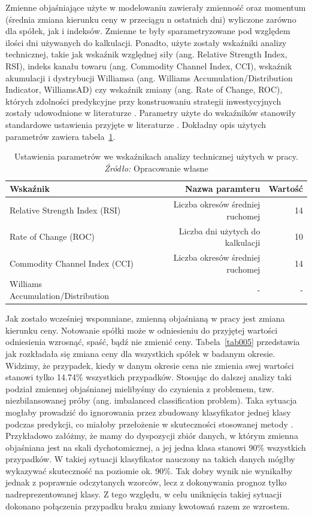\documentclass[12pt,a4paper,twoside,openany]{book}
\begin{document}
Zmienne objaśniające użyte w modelowaniu zawierały zmienność oraz momentum (średnia zmiana kierunku ceny w przeciągu n ostatnich dni) wyliczone zarówno dla spółek, jak i indeksów. Zmienne te były sparametryzowane pod względem ilości dni używanych do kalkulacji. Ponadto,  użyte zostały wskaźniki analizy technicznej, takie jak wskaźnik względnej siły (ang. Relative Strength Index, RSI), indeks kanału towaru (ang. Commodity Channel Index, CCI), wskaźnik akumulacji i dystrybucji Williamsa (ang. Williams Accumulation/Distribution Indicator, WilliamsAD) czy wskaźnik zmiany (ang. Rate of Change, ROC), których zdolności predykcyjne przy konstruowaniu strategii inwestycyjnych zostały udowodnione w literaturze \citep{patel2015}. Parametry użyte do wskaźników stanowiły standardowe ustawienia przyjęte w literaturze \citep{murphy1999}. Dokładny opis użytych parametrów zawiera tabela~\ref{tab004}.

\begin{table}[ht] 
\caption{Ustawienia parametrów we wskaźnikach analizy technicznej użytych w pracy. \textit{Źródło:} Opracowanie własne}\label{tab004}
\centering
\begin{tabular}{lrr}
  \hline
Wskaźnik & Nazwa paramteru & Wartość\\ 
  \hline
Relative Strength Index (RSI) & Liczba okresów średniej ruchomej & 14 \\
Rate of Change (ROC) & Liczba dni użytych do kalkulacji & 10 \\
Commodity Channel Index (CCI) & Liczba okresów średniej ruchomej & 14 \\
Williams Accumulation/Distribution & - & - \\
  \hline
\end{tabular}
\end{table}

Jak zostało wcześniej wspomniane, zmienną objaśnianą w pracy jest zmiana kierunku ceny. Notowanie spółki może w odniesieniu do przyjętej wartości odniesienia wzrosnąć, spaść, bądź nie zmienić ceny. Tabela~\ref{tab005} przedstawia jak rozkładała się zmiana ceny dla wszystkich spółek w badanym okresie. Widzimy, że przypadek, kiedy w danym okresie cena nie zmienia swej wartości stanowi tylko 14.74\% wszystkich przypadków. Stosując do dalszej analizy taki podział zmiennej objaśnianej mielibyśmy do czynienia z problemem, tzw. niezbilansowanej próby (ang. imbalanced classification problem). Taka sytuacja mogłaby prowadzić do ignorowania przez zbudowany klasyfikator jednej klasy podczas predykcji, co miałoby przełożenie w skuteczności stosowanej metody \citep{he2009}. Przykładowo załóżmy, że mamy do dyspozycji zbiór danych, w którym zmienna objaśniana jest na skali dychotomicznej, a jej jedna klasa stanowi 90\% wszystkich przypadków. W takiej sytuacji klasyfikator nauczony na takich danych mógłby wykazywać skuteczność na poziomie ok. 90\%. Tak dobry wynik nie wynikałby jednak z poprawnie odczytanych wzorców, lecz z dokonywania prognoz tylko nadreprezentowanej klasy. Z tego względu, w celu uniknięcia takiej sytuacji dokonano połączenia przypadku braku zmiany kwotowań razem ze wzrostem.
\end{document}
